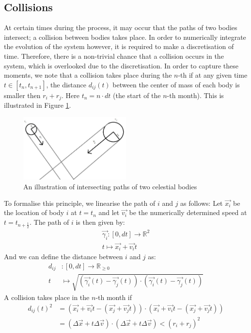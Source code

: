 \subsection{Collisions}
At certain times during the process, it may occur that the paths of two bodies intersect; a collision between bodies takes place. In order to numerically integrate the evolution of the system however, it is required to make a discretisation of time.
 Therefore, there is a non-trivial chance that a collision occurs in the system, which is overlooked due to the discretisation.
 In order to capture these moments, we note that a collision takes place during the \(n\)-th if at any given time \(t\in[t_{n},t_{n+1}]\), the distance \(d_{ij}(t)\) between the center of mass of each body is smaller then \(r_i+r_j\). 
 Here \(t_n=n\cdot dt\) (the start of the \(n\)-th month). This is illustrated in Figure \ref{fig:bots}.
\begin{figure}[H]
  \centering
  \includegraphics[width=0.5\textwidth]{botsingnaderbekeken}
  \caption{An illustration of intersecting paths of two celestial bodies}
  \label{fig:bots}
\end{figure}
 To formalise this principle, we linearise the path of \(i\) and \(j\) as follows: 
 Let \(\vec{x_i}\) be the location of body \(i\) at \(t=t_n\) and let \(\vec{v_i}\) be the numerically determined speed at \(t=t_{n+\frac{1}{2}}\).
The path of \(i\) is then given by:
\begin{align*}
\vec{\gamma_i}:[0,dt]\rightarrow\mathbb{R}^2 \\
t\mapsto \vec{x_i}+\vec{v_i}t
\end{align*}
And we can define the distance between \(i\) and \(j\) as:
\begin{align*}
	d_{ij}&:[0,dt]\rightarrow \mathbb{R}_{\geq 0}\\
	t&\mapsto \sqrt{(\vec{\gamma_i}(t)-\vec{\gamma_j}(t))\cdot(\vec{\gamma_i}(t)-\vec{\gamma_j}(t))}
\end{align*}
 A collision takes place in the \(n\)-th month if 
 \begin{align*}
	d_{ij}(t)^2&=(\vec{x_i}+\vec{v_i}t-(\vec{x_j}+\vec{v_j}t))\cdot (\vec{x_i}+\vec{v_i}t-(\vec{x_j}+\vec{v_j}t))\\
	&= (\Delta\vec{x} +t\Delta\vec{v})\cdot(\Delta\vec{x} +t\Delta\vec{v})<(r_i+r_j)^2
 \end{align*}
